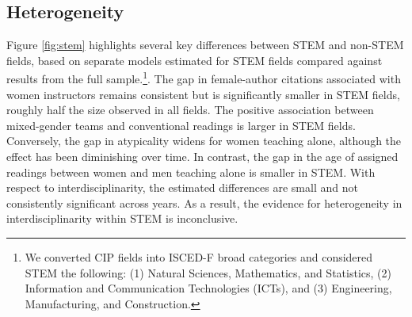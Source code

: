 \documentclass[
  british,
  12pt, %
]{article}
\begin{document}
\subsection{Heterogeneity}\label{heterogeneity}

Figure \ref{fig:stem} highlights several key differences between STEM and non-STEM fields, based on separate models estimated for STEM fields compared against results from the full sample.\footnote{
  We converted CIP fields into ISCED-F broad categories and considered STEM the following: (1) Natural Sciences, Mathematics, and Statistics,
  (2) Information and Communication Technologies (ICTs), and (3) Engineering, Manufacturing, and Construction.}. The gap in female-author citations associated with women instructors remains consistent but is significantly smaller in STEM fields, roughly half the size observed in all fields. The positive association between mixed-gender teams and conventional readings is larger in STEM fields. Conversely, the gap in atypicality widens for women teaching alone, although the effect has been diminishing over time. In contrast, the gap in the age of assigned readings between women and men teaching alone is smaller in STEM. With respect to interdisciplinarity, the estimated differences are small and not consistently significant across years. As a result, the evidence for heterogeneity in interdisciplinarity within STEM is inconclusive.
\end{document}
